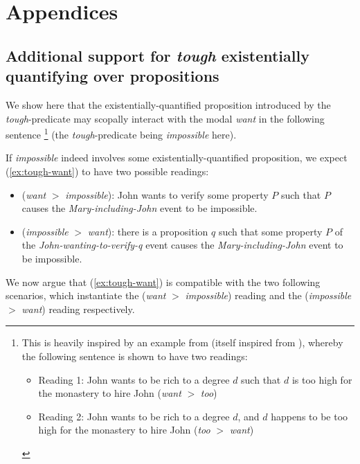 \documentclass[11pt]{article}
\begin{document}
	

	
	
	\iffalse
	Alsop: brave predicates Mary is brave to tell the truth. John was rude to ask Mary about her thesis. Restriction of the judgement to the particular event. Just like pretty. Mary-telling-the-truth cause a brave jusgement about Mary.
	\fi
\newpage


\newpage

\section{Appendices}

	\subsection{Additional support for \textit{tough} existentially quantifying over propositions}\label{app:tough-scope}
	We show here that the existentially-quantified proposition introduced by the \textit{tough}-predicate may scopally interact with the modal \textit{want} in the following sentence
	\footnote{This is heavily inspired by an example from \cite{Nissenbaum2011} (itself inspired from \cite{Heim2000}), whereby the following sentence is shown to have two readings:
		\begin{exe}
		\end{exe}
		\begin{itemize}
			\item Reading 1: John wants to be rich to a degree $d$ such that $d$ is too high for the monastery to hire John (\textit{want} $>$ \textit{too})
			\item Reading 2: John wants to be rich to a degree $d$, and $d$ happens to be too high for the monastery to hire John (\textit{too} $>$ \textit{want})
	\end{itemize}} (the \textit{tough}-predicate being \textit{impossible} here).
	\begin{exe}
		\label{ex:tough-want}
	\end{exe}
	 If \textit{impossible} indeed involves some existentially-quantified proposition, we expect (\ref{ex:tough-want}) to have two possible readings:
	\begin{itemize}
		\item (\textit{want} $>$ \textit{impossible}): John wants to verify some property $P$ such that $P$ causes the \textit{Mary-including-John} event to be impossible.
		\item (\textit{impossible} $>$ \textit{want}): there is a proposition $q$ such that some property $P$ of the \textit{John-wanting-to-verify-q} event causes the \textit{Mary-including-John} event to be impossible.
	\end{itemize}
	 We now argue that (\ref{ex:tough-want}) is compatible with the two following scenarios, which instantiate the (\textit{want} $>$ \textit{impossible}) reading and the (\textit{impossible} $>$ \textit{want}) reading respectively.
\end{document}
